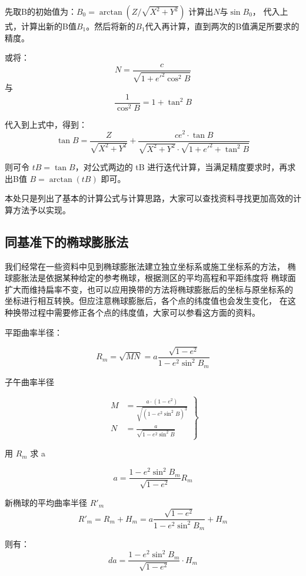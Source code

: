 
先取B的初始值为：$B_0 =\arctan{ (Z / \sqrt{X^2 + Y^2} ) }$ 计算出$N$与$\sin B_0$，
代入上式，计算出新的B值$B_1$。然后将新的$B_1$代入再计算，直到两次的B值满足所要求的
精度。

或将：
$$N = \frac{c}{\sqrt{1+e'^2 \cos ^2 B}}$$
与$$\frac{1}{\cos^2 B} = 1+ \tan^2 B$$

代入到上式中，得到：
\begin{equation}
    \tan B = \frac{Z}{\sqrt{X^2 + Y^2}} + \frac{ce^2 \cdot \tan B}{\sqrt{X^2 + Y^2} \cdot \sqrt{1 + e'^2 + \tan^2 B}}
\end{equation}

则可令 $tB = \tan B$，对公式两边的 tB 进行迭代计算，当满足精度要求时，再求出B值 $B = \arctan (tB)$ 即可。 %

本处只是列出了基本的计算公式与计算思路，大家可以查找资料寻找更加高效的计算方法予以实现。

\subsection{同基准下的椭球膨胀法}

我们经常在一些资料中见到椭球膨胀法建立独立坐标系或施工坐标系的方法，
椭球膨胀法是依据某种给定的参考椭球，根据测区的平均高程和平距纬度将
椭球面扩大而维持扁率不变，也可以应用换带的方法将椭球膨胀后的坐标与原坐标系的
坐标进行相互转换。但应注意椭球膨胀后，各个点的纬度值也会发生变化，
在这种换带过程中需要修正各个点的纬度值，大家可以参看这方面的资料。


平距曲率半径：

$$R_m = \sqrt{MN}= a \frac{\sqrt{1-e^2}}{1-e^2 \sin^2 B_m}$$


子午曲率半径

$$
\left .
\begin{aligned}
M &= \frac{a \cdot (1-e^2)}{\sqrt{(1-e^2 \sin ^2 B)^3}} \\
N &= \frac{a}{\sqrt{1-e^2 \sin^2 B}}
\end{aligned} 
\right \}
$$


用 $R_m$ 求 a

$$a = \frac{1-e^2 \sin^2 B_m }{\sqrt{1-e^2}} R_m$$


新椭球的平均曲率半径 $R'_m$
$$R'_m = R_m + H_m = a \frac{\sqrt{1-e^2}}{1-e^2 \sin^2 B_m} + H_m$$

则有：
$$da = \frac{1-e^2 \sin ^2 B_m}{\sqrt{1-e^2}} \cdot H_m$$

